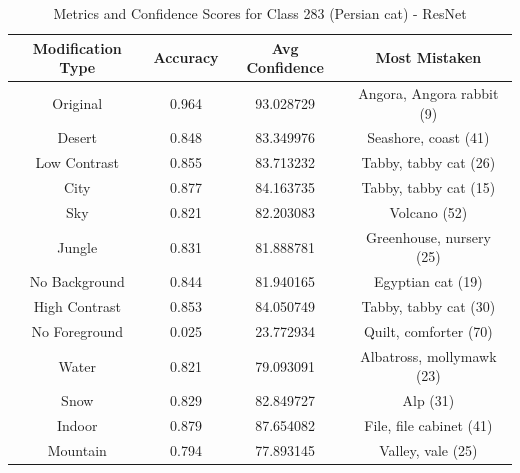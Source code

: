 \begin{table}
	\centering
	\begin{tabular}{|c|c|c|c|}
		\hline
		\textbf{Modification Type} & \textbf{Accuracy} & \textbf{Avg Confidence} & \textbf{Most Mistaken} \\
		\hline
		Original & 0.964 & 93.028729 & Angora, Angora rabbit (9) \\
		\hline
		Desert & 0.848 & 83.349976 & Seashore, coast (41) \\
		\hline
		Low Contrast & 0.855 & 83.713232 & Tabby, tabby cat (26) \\
		\hline
		City & 0.877 & 84.163735 & Tabby, tabby cat (15) \\
		\hline
		Sky & 0.821 & 82.203083 & Volcano (52) \\
		\hline
		Jungle & 0.831 & 81.888781 & Greenhouse, nursery (25) \\
		\hline
		No Background & 0.844 & 81.940165 & Egyptian cat (19) \\
		\hline
		High Contrast & 0.853 & 84.050749 & Tabby, tabby cat (30) \\
		\hline
		No Foreground & 0.025 & 23.772934 & Quilt, comforter (70) \\
		\hline
		Water & 0.821 & 79.093091 & Albatross, mollymawk (23) \\
		\hline
		Snow & 0.829 & 82.849727 & Alp (31) \\
		\hline
		Indoor & 0.879 & 87.654082 & File, file cabinet (41) \\
		\hline
		Mountain & 0.794 & 77.893145 & Valley, vale (25) \\
		\hline
	\end{tabular}
	\caption{Metrics and Confidence Scores for Class 283 (Persian cat) - ResNet}
	\label{tab:metrics_confidence_class_283_resnet}
\end{table}

